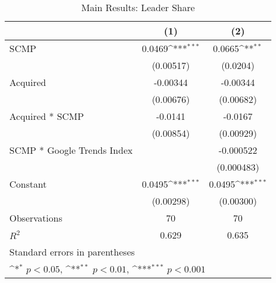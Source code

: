 \begin{table}[htbp]\centering
\def\sym#1{\ifmmode^{#1}\else\(^{#1}\)\fi}
\caption{Main Results: Leader Share\label{lead}}
\begin{tabular*}{0.75\textwidth}{@{\hskip\tabcolsep\extracolsep\fill}l*{2}{c}}
\hline\hline
                &\multicolumn{1}{c}{(1)}         &\multicolumn{1}{c}{(2)}         \\
\hline
SCMP            &   0.0469\sym{***}&   0.0665\sym{**} \\
                &(0.00517)         & (0.0204)         \\
[1em]
Acquired        & -0.00344         & -0.00344         \\
                &(0.00676)         &(0.00682)         \\
[1em]
Acquired * SCMP &  -0.0141         &  -0.0167         \\
                &(0.00854)         &(0.00929)         \\
[1em]
SCMP * Google Trends Index&                  &-0.000522         \\
                &                  &(0.000483)         \\
[1em]
Constant        &   0.0495\sym{***}&   0.0495\sym{***}\\
                &(0.00298)         &(0.00300)         \\
\hline
Observations    &       70         &       70         \\
\(R^{2}\)       &    0.629         &    0.635         \\
\hline\hline
\multicolumn{3}{l}{\footnotesize Standard errors in parentheses}\\
\multicolumn{3}{l}{\footnotesize \sym{*} \(p<0.05\), \sym{**} \(p<0.01\), \sym{***} \(p<0.001\)}\\
\end{tabular*}
\end{table}
